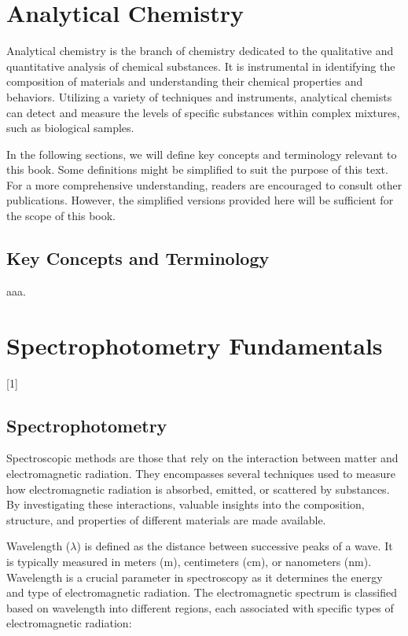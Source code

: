 \documentclass[
  9pt,
  american,
  a5paper,
  extrafontsizes,onecolumn,openright
  ]{memoir}
\newcommand{\toc}[1]{%
  \startcontents[chapters]%
  \printcontents[chapters]{}{1}[#1]{}%
  ~\newline%
}
\begin{document}
\chapter{Analytical Chemistry}\label{chapter1}

Analytical chemistry is the branch of chemistry dedicated to the qualitative and quantitative analysis of chemical substances. It is instrumental in identifying the composition of materials and understanding their chemical properties and behaviors. Utilizing a variety of techniques and instruments, analytical chemists can detect and measure the levels of specific substances within complex mixtures, such as biological samples.

In the following sections, we will define key concepts and terminology relevant to this book. Some definitions might be simplified to suit the purpose of this text. For a more comprehensive understanding, readers are encouraged to consult other publications. However, the simplified versions provided here will be sufficient for the scope of this book.

\section{Key Concepts and Terminology}\label{key-concepts-and-terminology}

aaa.

\chapter{Spectrophotometry Fundamentals}\label{chapter2}

\toc{1}

\newpage

\section{Spectrophotometry}\label{spectrophotometry}

Spectroscopic methods are those that rely on the interaction between matter and electromagnetic radiation. They encompasses several techniques used to measure how electromagnetic radiation is absorbed, emitted, or scattered by substances. By investigating these interactions, valuable insights into the composition, structure, and properties of different materials are made available.

Wavelength (\(\lambda\)) is defined as the distance between successive peaks of a wave. It is typically measured in meters (m), centimeters (cm), or nanometers (nm). Wavelength is a crucial parameter in spectroscopy as it determines the energy and type of electromagnetic radiation. The electromagnetic spectrum is classified based on wavelength into different regions, each associated with specific types of electromagnetic radiation:
\end{document}
